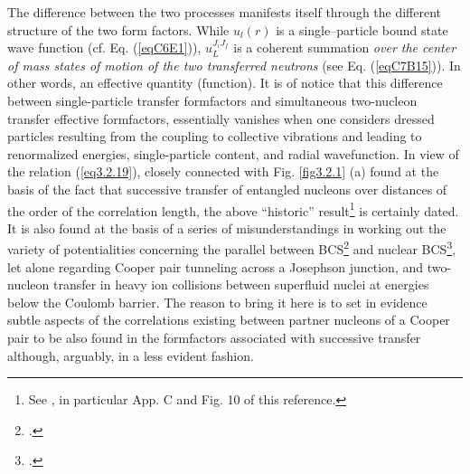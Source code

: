 The difference between the two processes manifests itself through the different structure of the two form factors. While $u_l(r)$  is a single--particle bound state wave function (cf. Eq. (\ref{eqC6E1})), $u_L^{J_i J_f}$ is a coherent summation \textit{over the center of mass states of motion of the two transferred neutrons} (see Eq. (\ref{eqC7B15})). In other words, an effective quantity (function). It is of notice that this difference between single-particle transfer formfactors and simultaneous two-nucleon transfer effective formfactors, essentially vanishes when one considers dressed particles resulting from the coupling to collective vibrations  and leading to renormalized energies, single-particle content, and radial wavefunction. 
In view of the relation (\ref{eq3.2.19}), closely connected with Fig. \ref{fig3.2.1} (a) found at the basis of the fact that successive transfer of entangled nucleons over distances of the order of the correlation length,  the above ``historic'' result\footnote{See \cite{Potel:13}, in particular App. C and Fig. 10 of this reference.} is certainly dated. It is also found at the basis of a series of misunderstandings in working out the variety of potentialities concerning the parallel between BCS\footnote{\cite{Cooper:11b}.} and nuclear BCS\footnote{\cite{Broglia:13}.}, let alone regarding Cooper pair tunneling across a Josephson junction, and two-nucleon transfer in heavy ion collisions between superfluid nuclei at energies below the Coulomb barrier. The reason to bring it here is to set in evidence subtle aspects of the correlations existing between partner nucleons of a Cooper pair to be also found in the formfactors associated with successive transfer although, arguably, in a less evident fashion.


